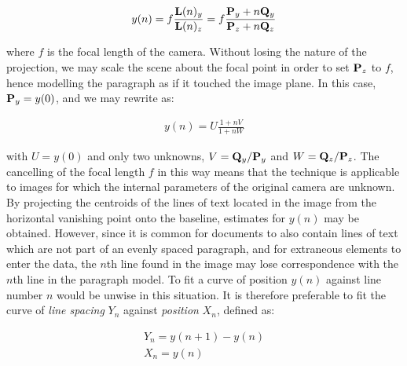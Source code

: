 {\begin{eqnarray}
y(n) = f \frac{ { \bf L }(n)_y }{ { \bf L }(n)_z } = f \frac{ { \bf P }_y + n { \bf Q }_y }{ { \bf P }_z + n{ \bf Q }_z } \label{spacingspq}
\end{eqnarray}

{ \parindent 0mm
where $f$ is the focal length of the camera.  Without losing the nature of the projection, we may scale the scene about the focal point in order to set ${ \bf P }_z$ to $f$, hence modelling the paragraph as if it touched the image plane.  In this case, ${ \bf P }_y=y(0)$,
and we may rewrite  as:
}

\begin{eqnarray}
y(n) = U \frac{ 1 + nV }{ 1 + nW }
\label{spacingsvweqn}
\end{eqnarray}

{ \parindent 0mm
with $U=y(0)$ and only two unknowns,
$V = {{ \bf Q }_y}/{{ \bf P }_y}$ and $W = {{ \bf Q }_z}/{{ \bf P }_z}$.
The cancelling of the focal length $f$ in this way means that the technique is applicable to images for which the internal parameters of the original camera are unknown.
By projecting the centroids of the lines of text located in the image from the horizontal vanishing point onto the baseline, estimates for $y(n)$ may be obtained.
However, since it is common for documents to also contain lines of text which are not part of an evenly spaced paragraph, and for extraneous elements to enter the data, the $n$th line found in the image may lose correspondence with the $n$th line in the paragraph model.
To fit a curve of position $y(n)$ against line number $n$ would be unwise in this situation.
It is therefore preferable to fit the curve of {\em line spacing} $Y_n$
against {\em position} $X_n$, defined as:

\begin{eqnarray}
Y_n=y(n+1)-y(n) \label{linespacingsdefneqn} \\
X_n=y(n) \label{linepositiondefneqn}
\end{eqnarray}

}}
